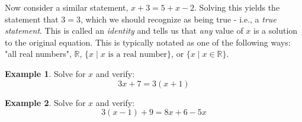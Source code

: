 \documentclass[addpoints,12pt]{exam}
\theoremstyle{definition}
\theoremstyle{break}
\theoremstyle{break}
\newtheorem{example}{Example}[subsection]
\begin{document}
\vspace{.15in}

\noindent Now consider a similar statement, $x + 3 = 5 + x - 2$. Solving this yields the statement that $3=3$, which we should recognize as being true - i.e., a \emph{true statement}. This is called an \emph{identity} and tells us that \emph{any} value of $x$ is a solution to the original equation. This is typically notated as one of the following ways: "all real numbers", $\mathbb{R}$, $\{x \mid x \text{ is a real number}\}$, or $\{x \mid x \in\mathbb{R}\}$.

\vspace{.15in}

\begin{example}
Solve for $x$ and verify: \[3x + 7 = 3(x+1)\]
\vspace{2in}
\end{example}

\begin{example}
Solve for $x$ and verify: \[3(x-1) + 9 = 8x + 6 - 5x\]
\end{example}
\end{document}
